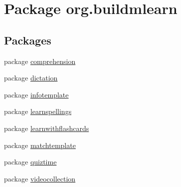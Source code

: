 \hypertarget{namespaceorg_1_1buildmlearn}{}\section{Package org.\+buildmlearn}
\label{namespaceorg_1_1buildmlearn}
\subsection*{Packages}
\begin{DoxyCompactItemize}
\item 
package \hyperlink{namespaceorg_1_1buildmlearn_1_1comprehension}{comprehension}
\item 
package \hyperlink{namespaceorg_1_1buildmlearn_1_1dictation}{dictation}
\item 
package \hyperlink{namespaceorg_1_1buildmlearn_1_1infotemplate}{infotemplate}
\item 
package \hyperlink{namespaceorg_1_1buildmlearn_1_1learnspellings}{learnspellings}
\item 
package \hyperlink{namespaceorg_1_1buildmlearn_1_1learnwithflashcards}{learnwithflashcards}
\item 
package \hyperlink{namespaceorg_1_1buildmlearn_1_1matchtemplate}{matchtemplate}
\item 
package \hyperlink{namespaceorg_1_1buildmlearn_1_1quiztime}{quiztime}
\item 
package \hyperlink{namespaceorg_1_1buildmlearn_1_1videocollection}{videocollection}
\end{DoxyCompactItemize}

